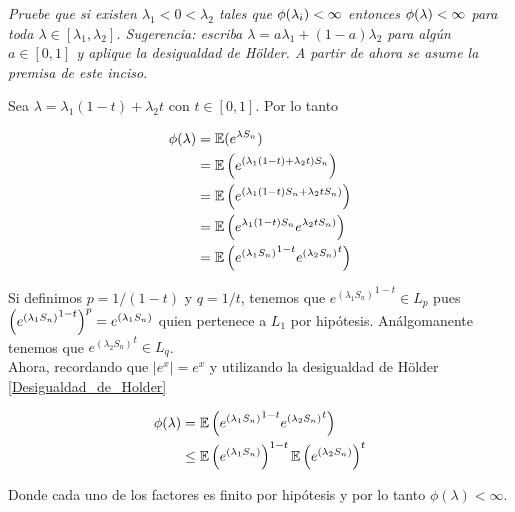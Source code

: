\emph{
	Pruebe que si existen $\lambda_1<0<\lambda_2$ tales que $\phi\!\left( \lambda_i\right) <\infty$ entonces $\phi\!\left( \lambda\right) <\infty$ 
	para toda $\lambda\in [\lambda_1,\lambda_2]$. Sugerencia: escriba $\lambda=a\lambda_1+(1-a)\lambda_2$ para alg\'un $a\in [0,1]$ 
	y aplique la desigualdad de H\"older. A partir de ahora se asume la premisa de este inciso.
}

\afterstatement\par\null

Sea $\lambda = \lambda_1 (1-t) + \lambda_2 t$ con $t \in [0, 1]$. Por lo tanto 

\begin{align}
    \phi(\lambda)   &= \mathbb{E}(e^{\lambda S_n})                                              \\
                    &= \mathbb{E}\left( e^{(\lambda_1 (1-t) + \lambda_2 t) S_n}\right)                 \\
                    &= \mathbb{E}\left( e^{(\lambda_1 (1-t) S_n + \lambda_2 tS_n) }\right)             \\  
                    &= \mathbb{E}\left( e^{\lambda_1 (1-t) S_n} e^{\lambda_2 tS_n) }\right)            \\  
                    &= \mathbb{E}\left( {e^{(\lambda_1 S_n)}}^{1-t} {e^{(\lambda_2 S_n)}}^t\right)       
\end{align}

Si definimos $p = 1/(1-t)$ y $q = 1/t$, tenemos que
${e^{(\lambda_1 S_n)}}^{1-t} \in L_p$ pues $\left( {e^{(\lambda_1 S_n)}}^{1-t}\right) ^p = e^{(\lambda_1 S_n)}$ quien 
pertenece a $L_1$ por hipótesis. Análgomanente tenemos que  ${e^{(\lambda_2 S_n)}}^t \in L_q$.\\

Ahora, recordando que $|e^x| = e^x$ y utilizando la desigualdad de Hölder \eqref{Desigualdad_de_Holder}

\begin{align}
    \phi(\lambda)   &=      \mathbb{E}\left( {e^{(\lambda_1 S_n)}}^{1-t} {e^{(\lambda_2 S_n)}}^t\right)            \\      
                    &\leq   \mathbb{E}\left( e^{(\lambda_1 S_n)}\right) ^{1-t} \mathbb{E}\left( e^{(\lambda_2 S_n)}\right) ^t     
\end{align}

Donde cada uno de los factores es finito por hipótesis y por lo tanto $\phi(\lambda) < \infty$.


